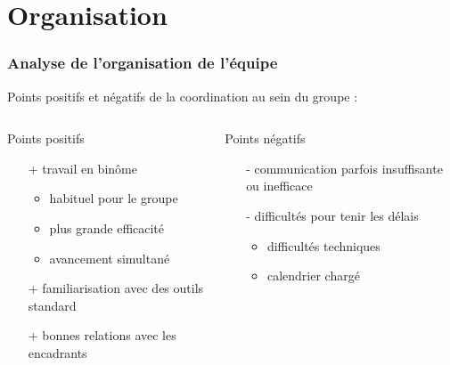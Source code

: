 \section{Organisation}

\begin{frame}
\tableofcontents[currentsection]
\end{frame}
\begin{frame}

\frametitle{Analyse de l'organisation de l'équipe}
Points positifs et négatifs de la coordination au sein du groupe :

\bigskip
  \begin{columns}[t]
  \begin{column}{5cm}
  \begin{exampleblock}{Points positifs}
\begin{itemize}
    \item[+] travail en binôme
      \begin{itemize}
      \item habituel pour le groupe
      \item plus grande efficacité
      \item avancement simultané
      \end{itemize}
    \item[+] familiarisation avec des outils standard
    \item[+] bonnes relations avec les encadrants
  \end{itemize}
  \end{exampleblock} 
  \end{column}
  
  \begin{column}{5cm}
  \begin{alertblock}{Points négatifs}
\begin{itemize}
    \item[-] communication parfois insuffisante ou inefficace
    \item[-] difficultés pour tenir les délais
      \begin{itemize}
      \item difficultés techniques
      \item calendrier chargé
      \end{itemize}
      
    \end{itemize}
  \end{alertblock}   
  \end{column}
  \end{columns}  

\end{frame}